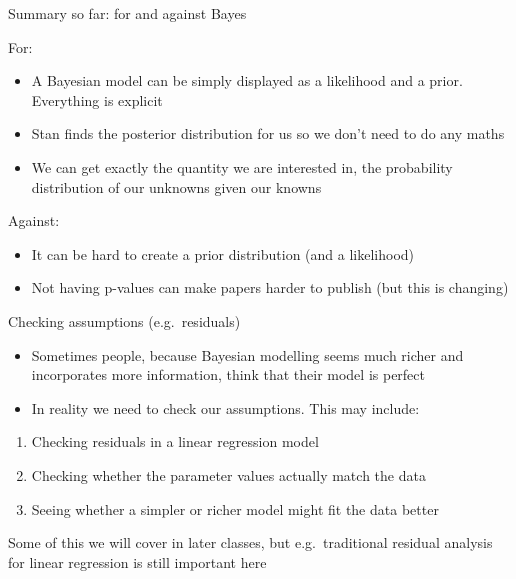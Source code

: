\documentclass[ignorenonframetext,]{beamer}
\providecommand{\tightlist}{%
  \setlength{\itemsep}{0pt}\setlength{\parskip}{0pt}}
\begin{document}
\begin{frame}{Summary so far: for and against Bayes}

For:

\begin{itemize}
\tightlist
\item
  A Bayesian model can be simply displayed as a likelihood and a prior.
  Everything is explicit
\item
  Stan finds the posterior distribution for us so we don't need to do
  any maths
\item
  We can get exactly the quantity we are interested in, the probability
  distribution of our unknowns given our knowns
\end{itemize}

Against:

\begin{itemize}
\tightlist
\item
  It can be hard to create a prior distribution (and a likelihood)
\item
  Not having p-values can make papers harder to publish (but this is
  changing)
\end{itemize}

\end{frame}

\begin{frame}{Checking assumptions (e.g.~residuals)}

\begin{itemize}
\tightlist
\item
  Sometimes people, because Bayesian modelling seems much richer and
  incorporates more information, think that their model is perfect
\item
  In reality we need to check our assumptions. This may include:
\end{itemize}

\begin{enumerate}
\def\labelenumi{\arabic{enumi}.}
\tightlist
\item
  Checking residuals in a linear regression model
\item
  Checking whether the parameter values actually match the data
\item
  Seeing whether a simpler or richer model might fit the data better
\end{enumerate}

Some of this we will cover in later classes, but e.g.~traditional
residual analysis for linear regression is still important here

\end{frame}
\end{document}
